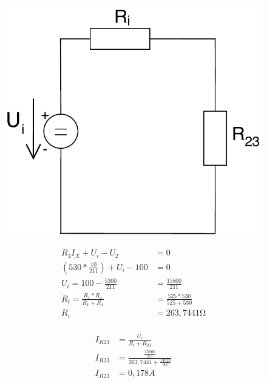 \documentclass[12pt,a4paper]{article}
\begin{document}
  \begin{minipage}{\linewidth}
      \centering
      \begin{minipage}{0.45\linewidth}
          \begin{figure}[H]
              \includegraphics[width=\linewidth]{Circuits/2-C.pdf}
          \end{figure}
      \end{minipage}
      \hspace{0.05\linewidth}
      \begin{minipage}{0.45\linewidth}
      	\begin{align*}
        		R_4I_X + U_i - U_2 &= 0 \\[0.5ex]
        		(530 * \frac{10}{211}) + U_i - 100 &= 0 \\[0.5ex]
        		U_i = 100 - \frac{5300}{211} &= \frac{15800}{211} \\[5mm]
        		R_i = \frac{R_1*R_4}{R_1+R_4} &= \frac{525 * 530}{525 + 530} \\[0.5ex]
        		R_i &= 263,7441 \si{\ohm} \\[0.5ex]
		\end{align*}
      \end{minipage}
  \end{minipage}
  
  \begin{align*}
  	I_{R23} &= \frac{U_i}{R_i + R_{23}} \\[0.5ex]
  	I_{R23} &= \frac{\frac{15800}{211}}{263,7441 + \frac{13020}{83}} \\[0.5ex]
  	I_{R23} &= 0,178 A
  \end{align*}
  
\end{document}
